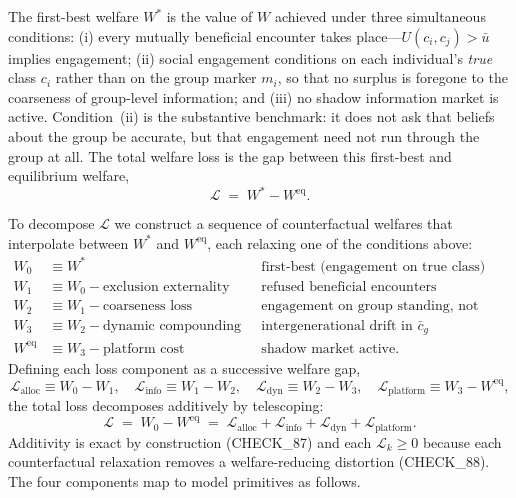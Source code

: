 \documentclass[12pt,a4paper]{article}
\theoremstyle{definition}
\numberwithin{proposition}{section}
\begin{document}
The first-best welfare $W^*$ is the value of $W$ achieved under three
simultaneous conditions: (i) every mutually beneficial encounter
takes place---$U(c_i, c_j) > \bar{u}$ implies engagement; (ii) social
engagement conditions on each individual's \emph{true} class $c_i$
rather than on the group marker $m_i$, so that no surplus is foregone
to the coarseness of group-level information; and (iii) no shadow
information market is active. Condition~(ii) is the substantive
benchmark: it does not ask that beliefs about the group be accurate,
but that engagement need not run through the group at all. The total
welfare loss is the gap between this first-best and equilibrium
welfare,
\begin{equation}
  \mathcal{L} \;=\; W^* - W^{\mathrm{eq}}.
\end{equation}

To decompose $\mathcal{L}$ we construct a sequence of counterfactual
welfares that interpolate between $W^*$ and $W^{\mathrm{eq}}$, each
relaxing one of the conditions above:
\begin{align*}
  W_0 &\equiv W^* && \text{first-best (engagement on true class)} \\
  W_1 &\equiv W_0 - \text{exclusion externality}
       && \text{refused beneficial encounters} \\
  W_2 &\equiv W_1 - \text{coarseness loss}
       && \text{engagement on group standing, not class} \\
  W_3 &\equiv W_2 - \text{dynamic compounding}
       && \text{intergenerational drift in } \bar{c}_g \\
  W^{\mathrm{eq}} &\equiv W_3 - \text{platform cost}
       && \text{shadow market active.}
\end{align*}
Defining each loss component as a successive welfare gap,
\begin{equation}
  \mathcal{L}_{\text{alloc}} \equiv W_0 - W_1, \quad
  \mathcal{L}_{\text{info}} \equiv W_1 - W_2, \quad
  \mathcal{L}_{\text{dyn}} \equiv W_2 - W_3, \quad
  \mathcal{L}_{\text{platform}} \equiv W_3 - W^{\mathrm{eq}},
  \label{eq:welfare-defs}
\end{equation}
the total loss decomposes additively by telescoping:
\begin{equation}
  \mathcal{L} \;=\; W_0 - W^{\mathrm{eq}}
        \;=\; \mathcal{L}_{\text{alloc}} + \mathcal{L}_{\text{info}}
        + \mathcal{L}_{\text{dyn}} + \mathcal{L}_{\text{platform}}.
  \label{eq:welfare}
\end{equation}
Additivity is exact by construction (CHECK\_87) and each
$\mathcal{L}_k \geq 0$ because each counterfactual relaxation
removes a welfare-reducing distortion (CHECK\_88). The four
components map to model primitives as follows.
\end{document}
